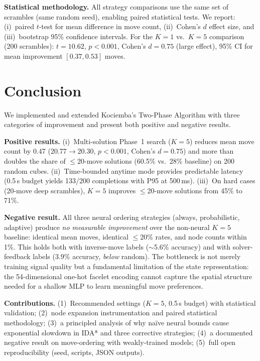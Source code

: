 \documentclass[10pt,twocolumn,a4paper]{article}
\begin{document}
\textbf{Statistical methodology.} All strategy comparisons use the same set of scrambles (same random seed), enabling paired statistical tests. We report: (i)~paired $t$-test for mean difference in move count, (ii)~Cohen's $d$ effect size, and (iii)~bootstrap 95\% confidence intervals. For the $K{=}1$ vs.\ $K{=}5$ comparison (200 scrambles): $t = 10.62$, $p < 0.001$, Cohen's $d = 0.75$ (large effect), 95\% CI for mean improvement $[0.37, 0.53]$ moves.

\section{Conclusion}
\label{sec:conclusion}

We implemented and extended Kociemba's Two-Phase Algorithm with three categories of improvement and present both positive and negative results.

\textbf{Positive results.} (i)~Multi-solution Phase~1 search ($K{=}5$) reduces mean move count by 0.47 (20.77$\to$20.30, $p < 0.001$, Cohen's $d = 0.75$) and more than doubles the share of $\leq$20-move solutions (60.5\% vs.\ 28\% baseline) on 200 random cubes. (ii)~Time-bounded anytime mode provides predictable latency (0.5\,s budget yields 133/200 completions with P95 at 500\,ms). (iii)~On hard cases (20-move deep scrambles), $K{=}5$ improves $\leq$20-move solutions from 45\% to 71\%.

\textbf{Negative result.} All three neural ordering strategies (always, probabilistic, adaptive) produce \emph{no measurable improvement} over the non-neural $K{=}5$ baseline: identical mean moves, identical $\leq$20\% rates, and node counts within 1\%. This holds both with inverse-move labels ($\sim$5.6\% accuracy) and with solver-feedback labels (3.9\% accuracy, \emph{below} random). The bottleneck is not merely training signal quality but a fundamental limitation of the state representation: the 54-dimensional one-hot facelet encoding cannot capture the spatial structure needed for a shallow MLP to learn meaningful move preferences.

\textbf{Contributions.} (1)~Recommended settings ($K{=}5$, 0.5\,s budget) with statistical validation; (2)~node expansion instrumentation and paired statistical methodology; (3)~a principled analysis of why na\"ive neural bounds cause exponential slowdown in IDA* and three corrective strategies; (4)~a documented negative result on move-ordering with weakly-trained models; (5)~full open reproducibility (seed, scripts, JSON outputs).
\end{document}
